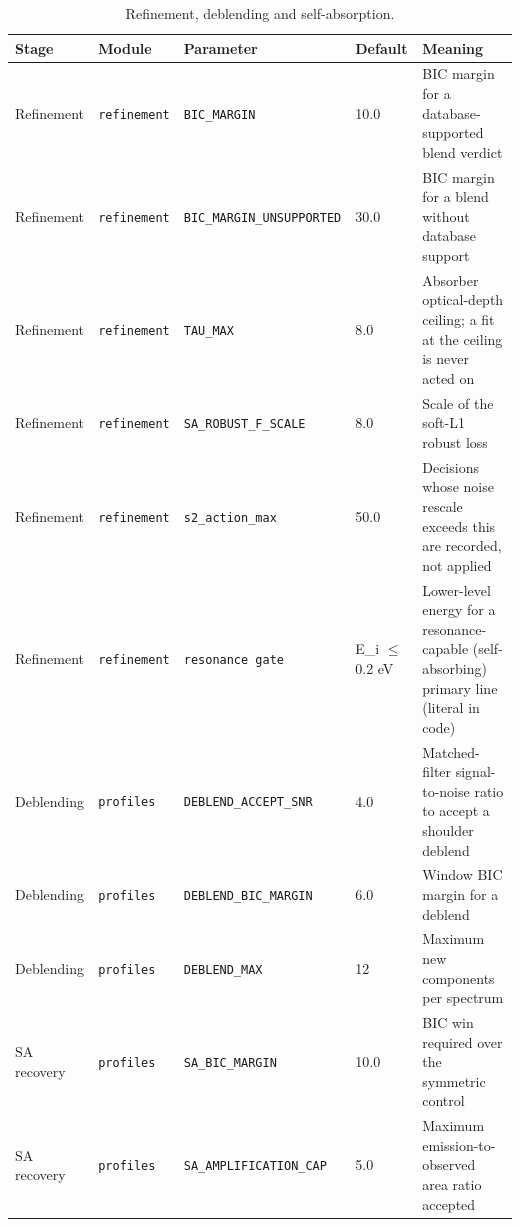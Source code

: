 \begin{table}[!htbp]
\centering
\caption{Refinement, deblending and self-absorption.}
\label{tab:params-refine}
\scriptsize
\setlength{\tabcolsep}{4pt}
\begin{tabular}{@{}p{}p{}p{}p{}p{}@{}}
\toprule
Stage & Module & Parameter & Default & Meaning \\
\midrule
Refinement & \texttt{refinement} & \texttt{BIC\_\allowbreak{}MARGIN} & 10.0 & BIC margin for a database-supported blend verdict \\
Refinement & \texttt{refinement} & \texttt{BIC\_\allowbreak{}MARGIN\_\allowbreak{}UNSUPPORTED} & 30.0 & BIC margin for a blend without database support \\
Refinement & \texttt{refinement} & \texttt{TAU\_\allowbreak{}MAX} & 8.0 & Absorber optical-depth ceiling; a fit at the ceiling is never acted on \\
Refinement & \texttt{refinement} & \texttt{SA\_\allowbreak{}ROBUST\_\allowbreak{}F\_\allowbreak{}SCALE} & 8.0 & Scale of the soft-L1 robust loss \\
Refinement & \texttt{refinement} & \texttt{s2\_\allowbreak{}action\_\allowbreak{}max} & 50.0 & Decisions whose noise rescale exceeds this are recorded, not applied \\
Refinement & \texttt{refinement} & \texttt{resonance gate} & E\_i $\le$ 0.2 eV & Lower-level energy for a resonance-capable (self-absorbing) primary line (literal in code) \\
Deblending & \texttt{profiles} & \texttt{DEBLEND\_\allowbreak{}ACCEPT\_\allowbreak{}SNR} & 4.0 & Matched-filter signal-to-noise ratio to accept a shoulder deblend \\
Deblending & \texttt{profiles} & \texttt{DEBLEND\_\allowbreak{}BIC\_\allowbreak{}MARGIN} & 6.0 & Window BIC margin for a deblend \\
Deblending & \texttt{profiles} & \texttt{DEBLEND\_\allowbreak{}MAX} & 12 & Maximum new components per spectrum \\
SA recovery & \texttt{profiles} & \texttt{SA\_\allowbreak{}BIC\_\allowbreak{}MARGIN} & 10.0 & BIC win required over the symmetric control \\
SA recovery & \texttt{profiles} & \texttt{SA\_\allowbreak{}AMPLIFICATION\_\allowbreak{}CAP} & 5.0 & Maximum emission-to-observed area ratio accepted \\
\bottomrule
\end{tabular}
\end{table}

